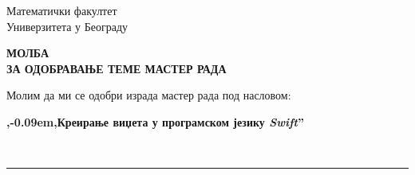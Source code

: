 \documentclass[a4paper]{article}
\def\zn{,\kern-0.09em,}
\begin{document}
\thispagestyle{empty}

\begin{flushleft}
Математички факултет\\
Универзитета у Београду
\end{flushleft}

\bigskip

\begin{center}
\textbf{МОЛБА\\
ЗА ОДОБРАВАЊЕ ТЕМЕ МАСТЕР РАДА
}\end{center}

\bigskip

\begin{flushleft}
Молим да ми се одобри израда мастер рада под насловом:
\end{flushleft}

\begin{minipage}{16.5cm}
\textbf{{\zn Креирање виџета у програмском језику \textit{Swift}''}}
\end{minipage}\\
\rule[4mm]{17.5cm}{.05mm}
\end{document}
